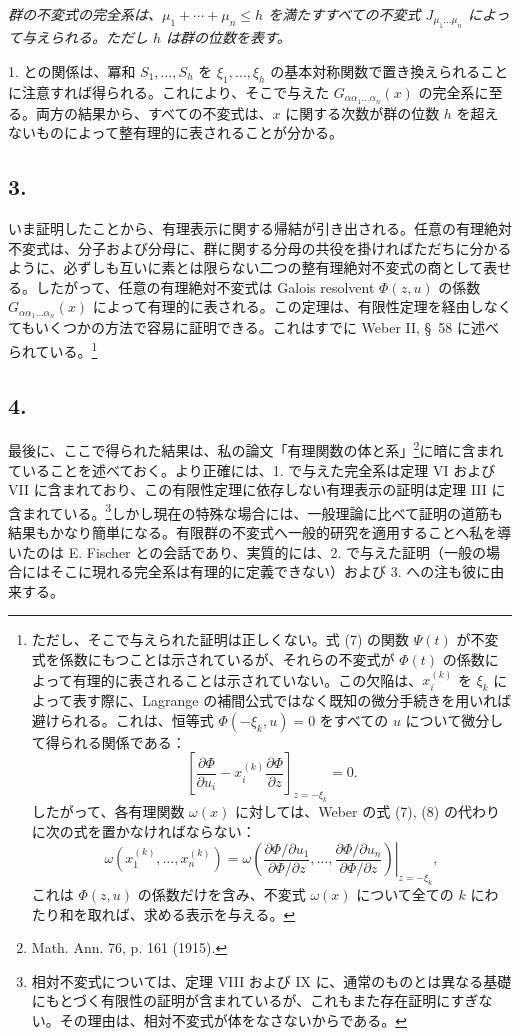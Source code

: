 \documentclass[11pt]{article}
\begin{document}
\emph{群の不変式の完全系は、$\mu_1+\cdots+\mu_n\le h$ を満たすすべての不変式 $J_{\mu_1\ldots\mu_n}$ によって与えられる。ただし $h$ は群の位数を表す。}

1. との関係は、冪和 $S_1,
\ldots,S_h$ を $\xi_1,
\ldots,
\xi_h$ の基本対称関数で置き換えられることに注意すれば得られる。これにより、そこで与えた $G_{\alpha\alpha_1\ldots\alpha_n}(x)$ の完全系に至る。両方の結果から、すべての不変式は、$x$ に関する次数が群の位数 $h$ を超えないものによって整有理的に表されることが分かる。

\subsection*{3.}
いま証明したことから、有理表示に関する帰結が引き出される。任意の有理絶対不変式は、分子および分母に、群に関する分母の共役を掛ければただちに分かるように、必ずしも互いに素とは限らない二つの整有理絶対不変式の商として表せる。したがって、任意の有理絶対不変式は Galois resolvent $\Phi(z,u)$ の係数 $G_{\alpha\alpha_1\ldots\alpha_n}(x)$ によって有理的に表される。この定理は、有限性定理を経由しなくてもいくつかの方法で容易に証明できる。これはすでに Weber II, \S\ 58 に述べられている。\footnote{ただし、そこで与えられた証明は正しくない。式 (7) の関数 $\Psi(t)$ が不変式を係数にもつことは示されているが、それらの不変式が $\Phi(t)$ の係数によって有理的に表されることは示されていない。この欠陥は、$x_i^{(k)}$ を $\xi_k$ によって表す際に、Lagrange の補間公式ではなく既知の微分手続きを用いれば避けられる。これは、恒等式 $\Phi(-\xi_k,u)=0$ をすべての $u$ について微分して得られる関係である：
\[
 \left[\frac{\partial\Phi}{\partial u_i}
      -x_i^{(k)}\frac{\partial\Phi}{\partial z}\right]_{z=-\xi_k}=0.
\]
したがって、各有理関数 $\omega(x)$ に対しては、Weber の式 (7), (8) の代わりに次の式を置かなければならない：
\[
 \omega(x_1^{(k)},\ldots,x_n^{(k)})=
 \left.
 \omega\!\left(
   \frac{\partial\Phi/\partial u_1}{\partial\Phi/\partial z},\ldots,
   \frac{\partial\Phi/\partial u_n}{\partial\Phi/\partial z}
 \right)\right|_{z=-\xi_k},
\]
これは $\Phi(z,u)$ の係数だけを含み、不変式 $\omega(x)$ について全ての $k$ にわたり和を取れば、求める表示を与える。}

\subsection*{4.}
最後に、ここで得られた結果は、私の論文「有理関数の体と系」\footnote{Math. Ann. 76, p. 161 (1915).}に暗に含まれていることを述べておく。より正確には、1. で与えた完全系は定理 VI および VII に含まれており、この有限性定理に依存しない有理表示の証明は定理 III に含まれている。\footnote{相対不変式については、定理 VIII および IX に、通常のものとは異なる基礎にもとづく有限性の証明が含まれているが、これもまた存在証明にすぎない。その理由は、相対不変式が体をなさないからである。}しかし現在の特殊な場合には、一般理論に比べて証明の道筋も結果もかなり簡単になる。有限群の不変式へ一般的研究を適用することへ私を導いたのは E. Fischer との会話であり、実質的には、2. で与えた証明（一般の場合にはそこに現れる完全系は有理的に定義できない）および 3. への注も彼に由来する。
\end{document}
